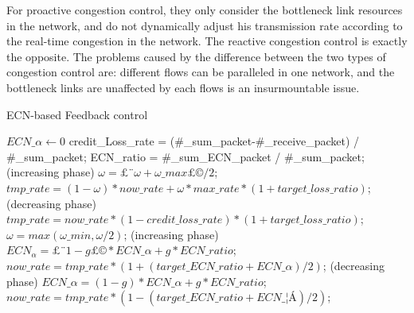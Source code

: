 \documentclass[conference]{IEEEtran}
\begin{document}
\indent For proactive congestion control, they only consider the bottleneck link resources in the network, and do not dynamically adjust his transmission rate according to the real-time congestion in the network. The reactive congestion control is exactly the opposite.  The problems caused by the difference between the two types of congestion control are: different flows can be paralleled in one network, and the bottleneck links are unaffected by each flows is an insurmountable issue.\\
\begin{algorithm}[!h]
\caption{ECN-based Feedback control}
\begin{algorithmic}[1]
\STATE $ECN\_\alpha \gets 0$
\REPEAT 
\STATE credit\_Loss\_rate = (\#\_sum\_packet-\#\_receive\_packet) / \#\_sum\_packet;
\STATE ECN\_ratio = \#\_sum\_ECN\_packet / \#\_sum\_packet;
        \STATE (increasing phase)
        \STATE $\omega=£¨\omega+\omega\_max£©/2$;
        \STATE $tmp\_rate = (1-\omega) * now\_rate +\omega*max\_rate*(1+ target\_loss\_ratio)$;
\ELSE
        \STATE (decreasing phase)
        \STATE $tmp\_rate=now\_rate*(1-credit\_loss\_rate)*(1+target\_loss\_ratio)$;
        \STATE $\omega=max(\omega\_min,\omega/2)$;       
\ENDIF
{}
        \STATE (increasing phase)
        \STATE $ECN_\alpha = £¨1-g£©* ECN\_\alpha+g * ECN\_ratio$;
        \STATE $now\_rate = tmp\_rate*(1+(target\_ECN\_ratio +ECN\_\alpha) / 2)$;    
\ELSE
        \STATE (decreasing phase)
        \STATE $ECN\_\alpha =(1-g)* ECN\_\alpha+g*ECN\_ratio$;
        \STATE $now\_rate = tmp\_rate*(1-(target\_ECN\_ratio +ECN\_¦Á) / 2)$;
\ENDIF 
{}   
\end{algorithmic}
\end{algorithm}
\end{document}
